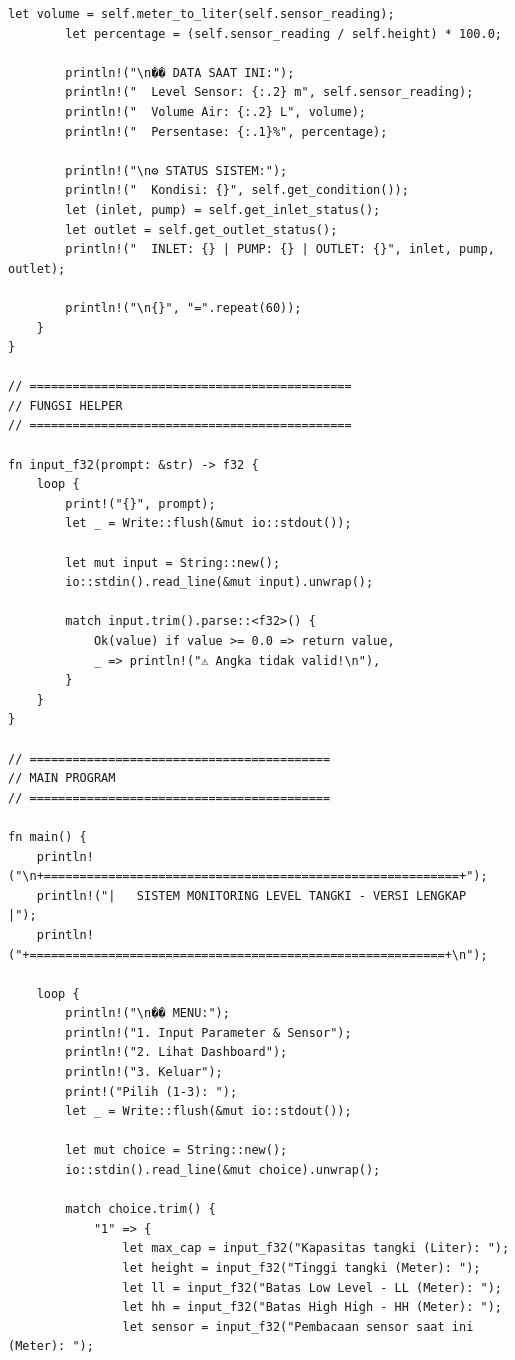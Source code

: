 \documentclass[12pt,a4paper]{article}
\begin{document}
\begin{lstlisting}[caption=Implementasi Lengkap Sistem Monitoring Tangki dalam Rust]
        let volume = self.meter_to_liter(self.sensor_reading);
        let percentage = (self.sensor_reading / self.height) * 100.0;
        
        println!("\n�� DATA SAAT INI:");
        println!("  Level Sensor: {:.2} m", self.sensor_reading);
        println!("  Volume Air: {:.2} L", volume);
        println!("  Persentase: {:.1}%", percentage);
        
        println!("\n⚙️ STATUS SISTEM:");
        println!("  Kondisi: {}", self.get_condition());
        let (inlet, pump) = self.get_inlet_status();
        let outlet = self.get_outlet_status();
        println!("  INLET: {} | PUMP: {} | OUTLET: {}", inlet, pump, outlet);
        
        println!("\n{}", "=".repeat(60));
    }
}

// =============================================
// FUNGSI HELPER
// =============================================

fn input_f32(prompt: &str) -> f32 {
    loop {
        print!("{}", prompt);
        let _ = Write::flush(&mut io::stdout());
        
        let mut input = String::new();
        io::stdin().read_line(&mut input).unwrap();
        
        match input.trim().parse::<f32>() {
            Ok(value) if value >= 0.0 => return value,
            _ => println!("⚠️ Angka tidak valid!\n"),
        }
    }
}

// ==========================================
// MAIN PROGRAM
// ==========================================

fn main() {
    println!("\n+==========================================================+");
    println!("|   SISTEM MONITORING LEVEL TANGKI - VERSI LENGKAP       |");
    println!("+==========================================================+\n");
    
    loop {
        println!("\n�� MENU:");
        println!("1. Input Parameter & Sensor");
        println!("2. Lihat Dashboard");
        println!("3. Keluar");
        print!("Pilih (1-3): ");
        let _ = Write::flush(&mut io::stdout());
        
        let mut choice = String::new();
        io::stdin().read_line(&mut choice).unwrap();
        
        match choice.trim() {
            "1" => {
                let max_cap = input_f32("Kapasitas tangki (Liter): ");
                let height = input_f32("Tinggi tangki (Meter): ");
                let ll = input_f32("Batas Low Level - LL (Meter): ");
                let hh = input_f32("Batas High High - HH (Meter): ");
                let sensor = input_f32("Pembacaan sensor saat ini (Meter): ");
                

\end{lstlisting}
\end{document}
